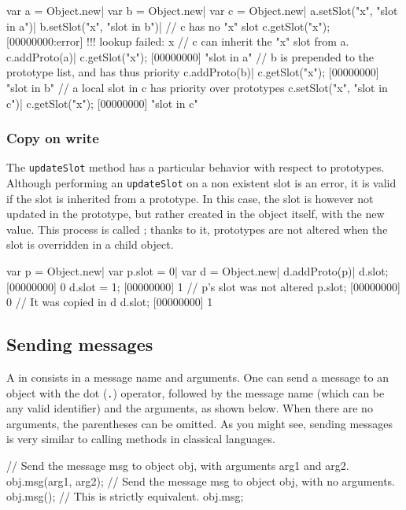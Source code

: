 \begin{urbiscript}
var a = Object.new|
var b = Object.new|
var c = Object.new|
a.setSlot("x", "slot in a")|
b.setSlot("x", "slot in b")|
// c has no "x" slot
c.getSlot("x");
[00000000:error] !!! lookup failed: x
// c can inherit the "x" slot from a.
c.addProto(a)|
c.getSlot("x");
[00000000] "slot in a"
// b is prepended to the prototype list, and has thus priority
c.addProto(b)|
c.getSlot("x");
[00000000] "slot in b"
// a local slot in c has priority over prototypes
c.setSlot("x", "slot in c")|
c.getSlot("x");
[00000000] "slot in c"
\end{urbiscript}

\subsubsection{Copy on write}

The \lstinline|updateSlot| method has a particular behavior with
respect to prototypes. Although performing an \lstinline|updateSlot|
on a non existent slot is an error, it is valid if the slot is
inherited from a prototype. In this case, the slot is however not
updated in the prototype, but rather created in the object itself,
with the new value. This process is called ; thanks
to it, prototypes are not altered when the slot is overridden in a
child object.

\begin{urbiscript}
var p = Object.new|
var p.slot = 0|
var d = Object.new|
d.addProto(p)|
d.slot;
[00000000] 0
d.slot = 1;
[00000000] 1
// p's slot was not altered
p.slot;
[00000000] 0
// It was copied in d
d.slot;
[00000000] 1
\end{urbiscript}

\subsection{Sending messages}

A  in \us consists in a message name and arguments. One can
send a message to an object with the dot (\lstinline|.|) operator,
followed by the message name (which can be any valid identifier) and
the arguments, as shown below. When there are no
arguments, the parentheses can be omitted. As you might see,
sending messages is very similar to calling methods in classical
languages.

\begin{urbiunchecked}
// Send the message msg to object obj, with arguments arg1 and arg2.
obj.msg(arg1, arg2);
// Send the message msg to object obj, with no arguments.
obj.msg();
// This is strictly equivalent.
obj.msg;
\end{urbiunchecked}

